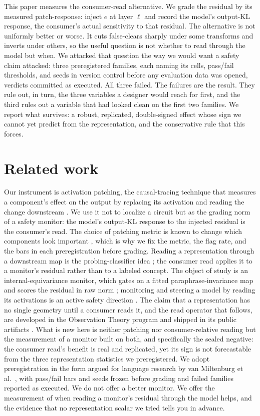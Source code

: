 \documentclass[11pt]{article}
\begin{document}
This paper measures the consumer-read alternative. We grade the residual by its
measured patch-response: inject $e$ at layer $\ell$ and record the model's
output-KL response, the consumer's actual sensitivity to that residual. The
alternative is not uniformly better or worse. It cuts false-clears sharply under
some transforms and inverts under others, so the useful question is not whether
to read through the model but when. We attacked that question the way we would
want a safety claim attacked: three preregistered families, each naming its
cells, pass/fail thresholds, and seeds in version control before any evaluation
data was opened, verdicts committed as executed. All three failed. The failures
are the result. They rule out, in turn, the three variables a designer would
reach for first, and the third rules out a variable that had looked clean on the
first two families. We report what survives: a robust, replicated, double-signed
effect whose sign we cannot yet predict from the representation, and the
conservative rule that this forces.

\section{Related work}

Our instrument is activation patching, the causal-tracing technique that
measures a component's effect on the output by replacing its activation and
reading the change downstream \cite{meng2022,wang2022}. We use it not to localize
a circuit but as the grading norm of a safety monitor: the model's output-KL
response to the injected residual is the consumer's read. The choice of patching
metric is known to change which components look important \cite{zhangnanda2024},
which is why we fix the metric, the flag rate, and the bars in each
preregistration before grading. Reading a representation through a downstream map
is the probing-classifier idea \cite{alain2016}; the consumer read applies it to
a monitor's residual rather than to a labeled concept. The object of study is an
internal-equivariance monitor, which gates on a fitted paraphrase-invariance map
and scores the residual in raw norm \cite{ieip2026}; monitoring and steering a
model by reading its activations is an active safety direction \cite{zou2023}.
The claim that a representation has no single geometry until a consumer reads it,
and the read operator that follows, are developed in the Observation Theory
program and shipped in its public artifacts \cite{turboquant,geoobs}. What is new
here is neither patching nor consumer-relative reading but the measurement of a
monitor built on both, and specifically the sealed negative: the consumer read's
benefit is real and replicated, yet its sign is not forecastable from the three
representation statistics we preregistered. We adopt preregistration in the form
argued for language research by van Miltenburg et al.\ \cite{vanmiltenburg2021},
with pass/fail bars and seeds frozen before grading and failed families reported
as executed. We do not offer a better monitor. We offer the measurement of when
reading a monitor's residual through the model helps, and the evidence that no
representation scalar we tried tells you in advance.
\end{document}
